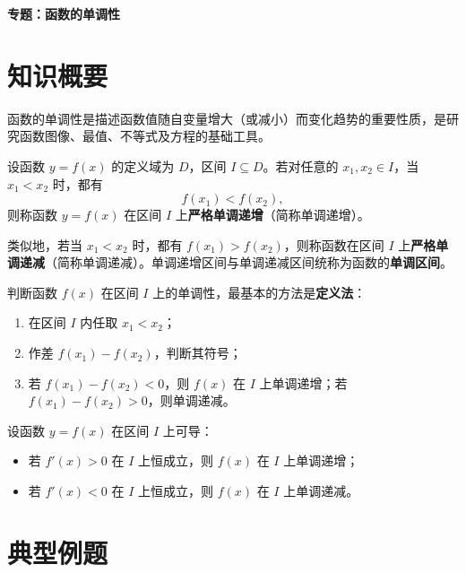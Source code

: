 \documentclass[11pt]{ctexrep}
\begin{document}
\begin{center}
    {\LARGE\bfseries 专题：函数的单调性}
\end{center}

\section*{知识概要}

函数的单调性是描述函数值随自变量增大（或减小）而变化趋势的重要性质，是研究函数图像、最值、不等式及方程的基础工具。

\begin{definition}[单调递增函数]
    设函数 $y = f(x)$ 的定义域为 $D$，区间 $I \subseteq D$。若对任意的 $x_1, x_2 \in I$，当 $x_1 < x_2$ 时，都有
    \[
        f(x_1) < f(x_2),
    \]
    则称函数 $y = f(x)$ 在区间 $I$ 上\textbf{严格单调递增}（简称单调递增）。
\end{definition}

类似地，若当 $x_1 < x_2$ 时，都有 $f(x_1) > f(x_2)$，则称函数在区间 $I$ 上\textbf{严格单调递减}（简称单调递减）。单调递增区间与单调递减区间统称为函数的\textbf{单调区间}。

\begin{property}[定义法判定]
    判断函数 $f(x)$ 在区间 $I$ 上的单调性，最基本的方法是\textbf{定义法}：
    \begin{enumerate}
        \item 在区间 $I$ 内任取 $x_1 < x_2$；
        \item 作差 $f(x_1) - f(x_2)$，判断其符号；
        \item 若 $f(x_1) - f(x_2) < 0$，则 $f(x)$ 在 $I$ 上单调递增；若 $f(x_1) - f(x_2) > 0$，则单调递减。
    \end{enumerate}
\end{property}

\begin{property}[导数法判定]
    设函数 $y = f(x)$ 在区间 $I$ 上可导：
    \begin{itemize}
        \item 若 $f'(x) > 0$ 在 $I$ 上恒成立，则 $f(x)$ 在 $I$ 上单调递增；
        \item 若 $f'(x) < 0$ 在 $I$ 上恒成立，则 $f(x)$ 在 $I$ 上单调递减。
    \end{itemize}
\end{property}

\section*{典型例题}
\end{document}
